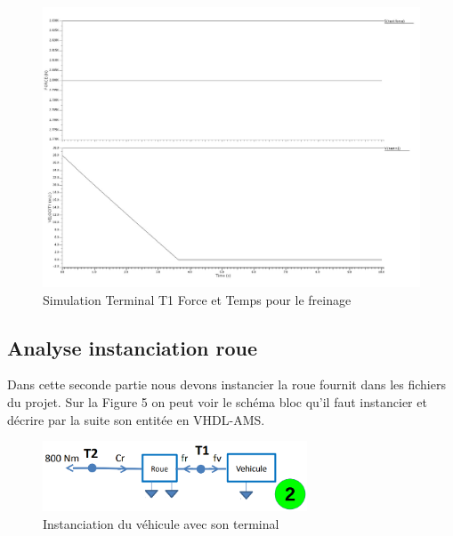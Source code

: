 \begin{figure}[h]
    \centering
    \includegraphics[width=\textwidth]{images/Instanciation_vehicule.jpg}
    \caption{Simulation Terminal T1 Force et Temps pour le freinage}
\end{figure}

\subsection{Analyse instanciation roue}

Dans cette seconde partie nous devons instancier la roue fournit dans les fichiers du projet. Sur la Figure 5 on peut voir le schéma bloc qu'il faut instancier et décrire par la suite son entitée en VHDL-AMS.

\begin{figure}[h]
    \centering
    \includegraphics[width=0.7\textwidth]{images/deux.png}
    \caption{Instanciation du véhicule avec son terminal}
\end{figure}

\newpage

